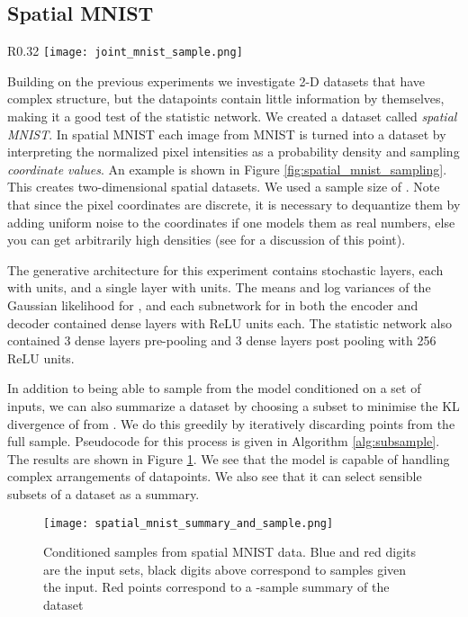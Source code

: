 \documentclass{article} \usepackage{iclr2017_conference,times}
\begin{document}
\subsection{Spatial MNIST}
\begin{wrapfigure}{R}{0.32\linewidth}
\centering
\texttt{[image: joint\_mnist\_sample.png]}
\caption{An \emph{image} from MNIST on the left, transformed to a \emph{set} of    coordinates, shown as a scatter plot on the right. \label{fig:spatial_mnist_sampling}}

\end{wrapfigure}
Building on the previous experiments we investigate 2-D datasets that have complex structure, but the datapoints contain little information by themselves, making it a good test of the statistic network. We created a dataset called \emph{spatial MNIST}. In spatial MNIST each image from MNIST \citep{mnist} is turned into a dataset by interpreting the normalized pixel intensities as a probability density and sampling \emph{coordinate values}. An example is shown in Figure \ref{fig:spatial_mnist_sampling}. This creates two-dimensional spatial datasets. We used a sample size of . Note that since the pixel coordinates are discrete, it is necessary to dequantize them by adding uniform noise  to the coordinates if one models them as real numbers, else you can get arbitrarily high densities (see \citet{note_evaluation_generative} for a discussion of this point).

The generative architecture for this experiment contains  stochastic  layers, each with  units, and a single  layer with  units. The means and log variances of the Gaussian likelihood for , and each subnetwork for  in both the encoder and decoder contained  dense layers with  ReLU units each. The statistic network also contained 3 dense layers pre-pooling and 3 dense layers post pooling with 256 ReLU units.

In addition to being able to sample from the model conditioned on a set of inputs, we can also summarize a dataset by choosing a subset  to minimise the KL divergence of  from . We do this greedily by iteratively discarding points from the full sample. Pseudocode for this process is given in Algorithm \ref{alg:subsample}.
The results are shown in Figure \ref{fig:spatial_mnist_examples}. We see that the model is capable of handling complex arrangements of datapoints. We also see that it can select sensible subsets of a dataset as a summary. 
\begin{figure}
\centering
\texttt{[image: spatial\_mnist\_summary\_and\_sample.png]}
\vspace{-1.5em}
\caption{Conditioned samples from spatial MNIST data. Blue and red digits are the input sets, black digits above correspond to samples given the input. Red points correspond to a -sample summary of the dataset \label{fig:spatial_mnist_examples}}
\end{figure}
\end{document}
